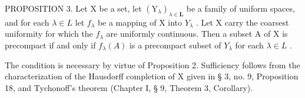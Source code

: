 PROPOSITION 3. Let X be a set, let \((\mathrm{Y}_{\lambda})_{\lambda \in \mathbf{L}}\) be a family of uniform spaces, and for each \(\lambda \in L\) let \(f_{\lambda}\) be a mapping of X into \(Y_{\lambda}\) . Let X carry the coarsest uniformity for which the \(f_{\lambda}\) are uniformly continuous. Then a subset A of X is precompact if and only if \(f_{\lambda}(A)\) is a precompact subset of \(Y_{\lambda}\) for each \(\lambda \in L\) .

The condition is necessary by virtue of Proposition 2. Sufficiency follows from the characterization of the Hausdorff completion of X given in § 3, no. 9, Proposition 18, and Tychonoff's theorem (Chapter I, § 9, Theorem 3, Corollary).

